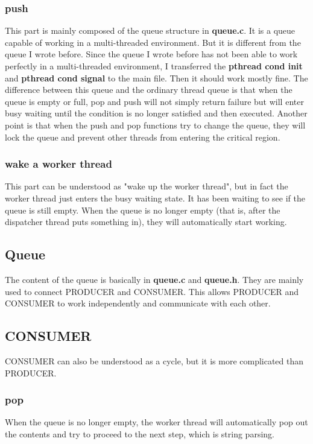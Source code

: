 \documentclass{article}
\begin{document}
        \subsubsection{push}
            This part is mainly composed of the queue structure in \textbf{queue.c}. It is a queue capable of working in a multi-threaded environment. But it is different from the queue I wrote before. Since the queue I wrote before has not been able to work perfectly in a multi-threaded environment, I transferred the \textbf{pthread cond init} and \textbf{pthread cond signal} to the main file. Then it should work mostly fine. The difference between this queue and the ordinary thread queue is that when the queue is empty or full, pop and push will not simply return failure but will enter busy waiting until the condition is no longer satisfied and then executed. Another point is that when the push and pop functions try to change the queue, they will lock the queue and prevent other threads from entering the critical region.
        \subsubsection{wake a worker thread}
            This part can be understood as "wake up the worker thread", but in fact the worker thread just enters the busy waiting state. It has been waiting to see if the queue is still empty. When the queue is no longer empty (that is, after the dispatcher thread puts something in), they will automatically start working.
    \subsection{Queue}
        The content of the queue is basically in \textbf{queue.c} and \textbf{queue.h}. They are mainly used to connect PRODUCER and CONSUMER. This allows PRODUCER and CONSUMER to work independently and communicate with each other.
    \subsection{CONSUMER}
        CONSUMER can also be understood as a cycle, but it is more complicated than PRODUCER.
        \subsubsection{pop}
            When the queue is no longer empty, the worker thread will automatically pop out the contents and try to proceed to the next step, which is string parsing.
\end{document}
